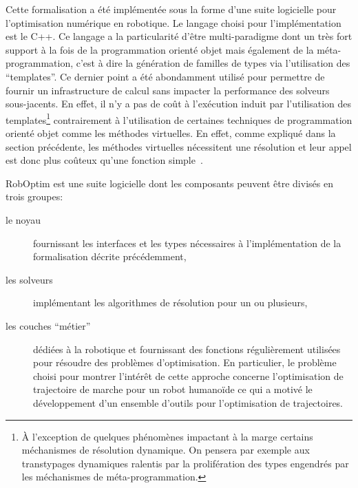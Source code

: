 Cette formalisation a été implémentée sous la forme d'une suite
logicielle pour l'optimisation numérique en robotique. Le langage
choisi pour l'implémentation est le C++. Ce langage a la particularité
d'être multi-paradigme dont un très fort support à la fois de la
programmation orienté objet mais également de la
méta-programmation, c'est à dire la
génération de familles de types via l'utilisation des
``templates''. Ce dernier point a été abondamment utilisé pour
permettre de fournir un infrastructure de calcul sans impacter la
performance des solveurs sous-jacents. En effet, il n'y a pas de coût
à l'exécution induit par l'utilisation des templates\footnote{À
  l'exception de quelques phénomènes impactant à la marge certains
  méchanismes de résolution dynamique. On pensera par exemple aux
  transtypages dynamiques ralentis par la prolifération des types
  engendrés par les méchanismes de méta-programmation.} contrairement
à l'utilisation de certaines techniques de programmation orienté objet
comme les méthodes virtuelles. En effet, comme expliqué dans la
section précédente, les méthodes virtuelles nécessitent une résolution
et leur appel est donc plus coûteux qu'une fonction
simple~\citep{driesen1996direct}.


RobOptim est une suite logicielle dont les composants
peuvent être divisés en trois groupes:
\begin{description}
\item[le noyau] fournissant les interfaces et les types nécessaires à
  l'implémentation de la formalisation décrite précédemment,
\item[les solveurs] implémentant les algorithmes de résolution pour un ou plusieurs,
\item[les couches ``métier''] dédiées à la
  robotique et fournissant des fonctions régulièrement utilisées pour
  résoudre des problèmes d'optimisation. En particulier, le problème
  choisi pour montrer l'intérêt de cette approche concerne
  l'optimisation de trajectoire de marche pour un robot humanoïde ce
  qui a motivé le développement d'un ensemble d'outils pour
  l'optimisation de trajectoires.
\end{description}

